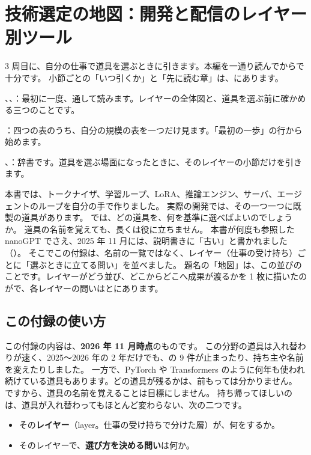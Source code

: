 \chapter{技術選定の地図：開発と配信のレイヤー別ツール}\label{app:toolmap}

\begin{readingguide}
\item[\rgpre] 3 周目に、自分の仕事で道具を選ぶときに引きます。本編を一通り読んでからで十分です。
  小節ごとの「いつ引くか」と「先に読む章」は、にあります。
\item[\rgmust] 、、：最初に一度、通して読みます。レイヤーの全体図と、道具を選ぶ前に確かめる三つのことです。
\item[\rgskim] ：四つの表のうち、自分の規模の表を一つだけ見ます。「最初の一歩」の行から始めます。
\item[\rglater] 、：辞書です。道具を選ぶ場面になったときに、そのレイヤーの小節だけを引きます。
\end{readingguide}

本書では、トークナイザ、学習ループ、LoRA、推論エンジン、サーバ、エージェントのループを自分の手で作りました。
実際の開発では、その一つ一つに既製の道具があります。
では、どの道具を、何を基準に選べばよいのでしょうか。
道具の名前を覚えても、長くは役に立ちません。
本書が何度も参照した nanoGPT でさえ、2025 年 11 月には、説明書きに「古い」と書かれました（）。
そこでこの付録は、名前の一覧ではなく、レイヤー（仕事の受け持ち）ごとに「選ぶときに立てる問い」を並べました。
題名の「地図」は、この並びのことです。レイヤーがどう並び、どこからどこへ成果が渡るかを 1 枚に描いたのがで、各レイヤーの問いはとにあります。

\section{この付録の使い方}\label{sec:tm-howto}

この付録の内容は、\textbf{2026 年 11 月時点}のものです。
この分野の道具は入れ替わりが速く、2025〜2026 年の 2 年だけでも、の 9 件が止まったり、持ち主や名前を変えたりしました。
一方で、PyTorch や Transformers のように何年も使われ続けている道具もあります。どの道具が残るかは、前もっては分かりません。
ですから、道具の名前を覚えることは目標にしません。
持ち帰ってほしいのは、道具が入れ替わってもほとんど変わらない、次の二つです。
\begin{itemize}
\item その\textbf{レイヤー}（layer。仕事の受け持ちで分けた層）が、何をするか。
\item そのレイヤーで、\textbf{選び方を決める問い}は何か。
\end{itemize}

